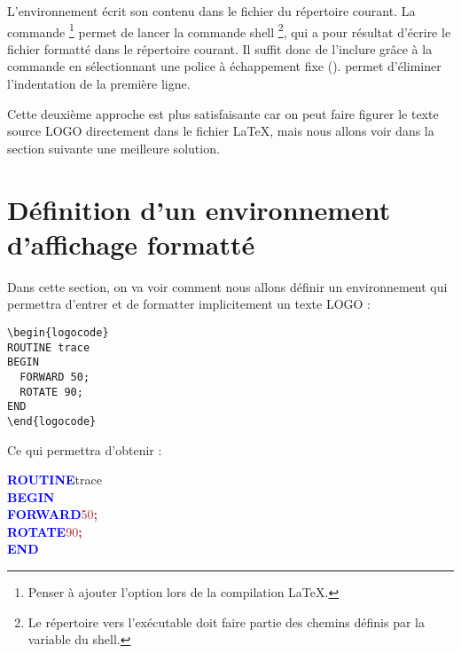 L'environnement  écrit son contenu dans le fichier  du répertoire courant. La commande \footnote{Penser à ajouter l'option  lors de la compilation \LaTeX.} permet de lancer la commande shell \footnote{Le répertoire vers l'exécutable  doit faire partie des chemins définis par la variable  du shell.}, qui a pour résultat d'écrire le fichier formatté  dans le répertoire courant. Il suffit donc de l'inclure grâce à la commande  en sélectionnant une police à échappement fixe ().  permet d'éliminer l'indentation de la première ligne.

Cette deuxième approche est plus satisfaisante car on peut faire figurer le texte source LOGO directement dans le fichier \LaTeX, mais nous allons voir dans la section suivante une meilleure solution.











\section{Définition d'un environnement d'affichage formatté}

Dans cette section, on va voir comment nous allons définir un environnement  qui permettra d'entrer et de formatter implicitement un texte LOGO :

\begin{verbatim}
\begin{logocode}
ROUTINE trace
BEGIN
  FORWARD 50;
  ROTATE 90;
END
\end{logocode}
\end{verbatim}

Ce qui permettra d'obtenir :

{\noindent\ttfamily
\textcolor{blue}{\bf ROUTINE}\hspace*{.6em}t{}r{}a{}c{}e{} \\
\textcolor{blue}{\bf BEGIN} \\
\hspace*{1.2em}\textcolor{blue}{\bf FORWARD}\hspace*{.6em}\textcolor{brown}{5{}0{}}\textcolor{brown}{\bf ;} \\
\hspace*{1.2em}\textcolor{blue}{\bf ROTATE}\hspace*{.6em}\textcolor{brown}{9{}0{}}\textcolor{brown}{\bf ;} \\
\textcolor{blue}{\bf END}
}


